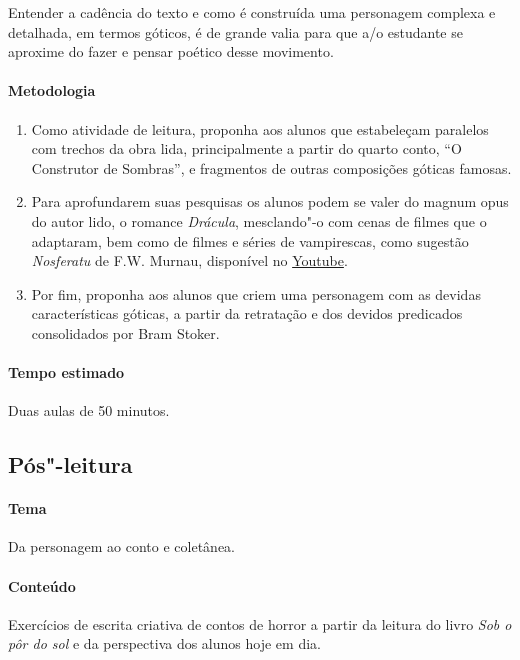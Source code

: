 \documentclass[12pt]{extarticle}
\begin{document}
Entender a cadência do texto e como é construída uma personagem complexa e detalhada, em 
termos góticos, é de grande valia para que a/o estudante se aproxime do fazer e pensar poético 
desse movimento. 

\paragraph{Metodologia}

\begin{enumerate}
\item
Como atividade de leitura, proponha aos alunos que estabeleçam paralelos com trechos da obra
lida, principalmente a partir do quarto conto, ``O Construtor de Sombras'', e fragmentos de outras 
composições góticas famosas. 

\item
Para aprofundarem suas pesquisas os alunos podem se valer do magnum opus do autor lido, o romance 
\emph{Drácula}, mesclando"-o com cenas de filmes que o adaptaram, bem como de filmes e séries de
vampirescas, como sugestão \emph{Nosferatu} de F.W. Murnau, disponível no \href{https://www.youtube.com/watch?v=FC6jFoYm3xs&ab_channel=TimelessClassicMovies}{Youtube}.


\item
Por fim, proponha aos alunos que criem uma personagem com as devidas características góticas, 
a partir da retratação e dos devidos predicados consolidados por Bram Stoker.
 
\end{enumerate}

\paragraph{Tempo estimado} Duas aulas de 50 minutos. 

\subsection{Pós"-leitura}

\paragraph{Tema} Da personagem ao conto e coletânea. 

\paragraph{Conteúdo} Exercícios de escrita criativa de contos de horror a partir
da leitura do livro \emph{Sob o pôr do sol} e da perspectiva dos alunos hoje em dia.
\end{document}
